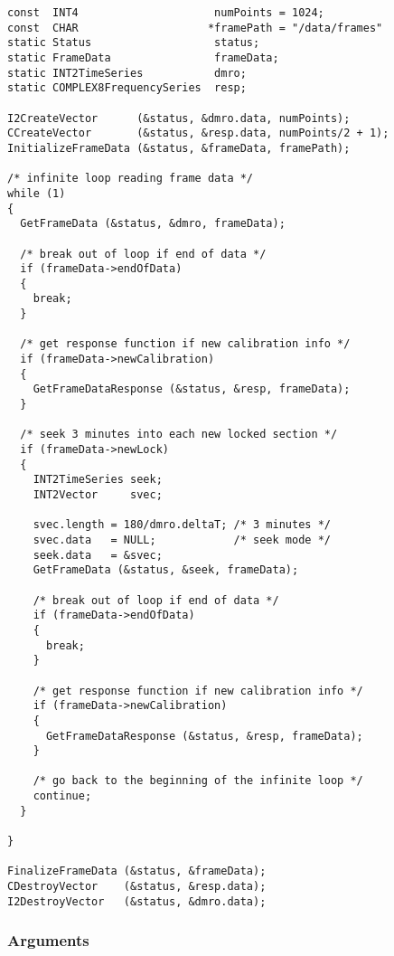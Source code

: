 \documentclass{article}
\begin{document}
\begin{verbatim}
const  INT4                     numPoints = 1024;
const  CHAR                    *framePath = "/data/frames"
static Status                   status;
static FrameData                frameData;
static INT2TimeSeries           dmro;
static COMPLEX8FrequencySeries  resp;

I2CreateVector      (&status, &dmro.data, numPoints);
CCreateVector       (&status, &resp.data, numPoints/2 + 1);
InitializeFrameData (&status, &frameData, framePath);

/* infinite loop reading frame data */
while (1)
{
  GetFrameData (&status, &dmro, frameData);

  /* break out of loop if end of data */
  if (frameData->endOfData)
  {
    break;
  }

  /* get response function if new calibration info */
  if (frameData->newCalibration)
  {
    GetFrameDataResponse (&status, &resp, frameData);
  }

  /* seek 3 minutes into each new locked section */
  if (frameData->newLock)
  {
    INT2TimeSeries seek;
    INT2Vector     svec;

    svec.length = 180/dmro.deltaT; /* 3 minutes */
    svec.data   = NULL;            /* seek mode */
    seek.data   = &svec;
    GetFrameData (&status, &seek, frameData);

    /* break out of loop if end of data */
    if (frameData->endOfData)
    {
      break;
    }

    /* get response function if new calibration info */
    if (frameData->newCalibration)
    {
      GetFrameDataResponse (&status, &resp, frameData);
    }

    /* go back to the beginning of the infinite loop */
    continue;
  }

}

FinalizeFrameData (&status, &frameData);
CDestroyVector    (&status, &resp.data);
I2DestroyVector   (&status, &dmro.data);
\end{verbatim}

\subsubsection{Arguments}
\end{document}
